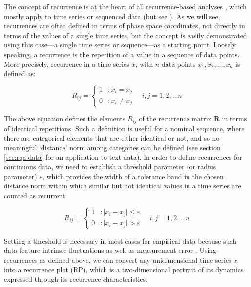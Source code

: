 The concept of recurrence is at the heart of all recurrence-based analyses \citep{marwan2002nonlinear, trulla1996recurrence}, which mostly apply to time series or sequenced data (but see \cite{wallot2018deriving}). As we will see, recurrences are often defined in terms of phase space coordinates, not directly in terms of the values of a single time series, but the concept is easily demonstrated using this case---a single time series or sequence---as a starting point. Loosely speaking, a recurrence is the repetition of a value in a sequence of data points. More precisely, recurrence in a time series $x$, with $n$ data points $x_1,x_2,\ldots,x_n$ is defined as:

\begin{equation}
    R_{ij} = \left\{
  \begin{array}{lr}
    1 & : x_i = x_j\\
    0 & : x_i \neq x_j
  \end{array}
\right.
\quad
i,j = 1,2, \ldots n
\end{equation}

The above equation defines the elements $R_{ij}$ of the recurrence matrix $\mathbf{R}$ in terms of identical repetitions. Such a definition is useful for a nominal sequence, where there are categorical elements that are either identical or not, and so no meaningful `distance' norm among categories can be defined (see section \ref{sec:rqa:data} for an application to text data). In order to define recurrences for continuous data, we need to establish a threshold parameter (or radius parameter) $\varepsilon$, which provides the width of a tolerance band in the chosen distance norm within which similar but not identical values in a time series are counted as recurrent:

\begin{equation}\label{eq:Rij_1d}
    R_{ij} = \left\{
  \begin{array}{lr}
    1 & : \vert x_i - x_j \vert \leq \varepsilon \\
    0 & : \vert x_i - x_j \vert > \varepsilon
  \end{array}
\right.
\quad
i,j = 1,2, \ldots n
\end{equation}

Setting a threshold is necessary in most cases for empirical data because such data feature intrinsic fluctuations as well as measurement error \citep{marwan2007recurrence}.
Using recurrences as defined above, we can convert any unidimensional time series $x$ into a recurrence plot (RP), which is a two-dimensional portrait of its dynamics expressed through its recurrence characteristics.

